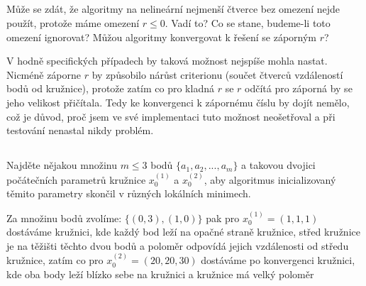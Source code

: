 \documentclass[10pt,a4paper,openright]{article}
\begin{document}
\subsection{}
Může se zdát, že algoritmy na nelineární nejmenší čtverce bez omezení nejde použít, 
protože máme omezení $r \le 0$. Vadí to? 
Co se stane, budeme-li toto omezení ignorovat? 
Můžou algoritmy konvergovat k řešení se záporným $r$?

V hodně specifických případech by taková možnost nejspíše mohla nastat. Nicméně 
záporne $r$ by způsobilo nárůst criterionu (součet čtverců vzdáleností bodů od kružnice),
protože zatím co pro kladná $r$ se $r$ odčítá pro záporná by se jeho velikost přičítala.
Tedy ke konvergenci k zápornému číslu by dojít nemělo, což je důvod, proč jsem
ve své implementaci tuto možnost neošetřoval a při testování nenastal nikdy problém.

\subsection{}
Najděte nějakou množinu $m \le 3$ bodů $\{a_1,a_2,...,a_m\}$
a takovou dvojici počátečních parametrů kružnice $x^{(1)}_0$ a $x^{(2)}_0$, 
aby algoritmus inicializovaný těmito parametry skončil v různých lokálních minimech.

Za množinu bodů zvolíme: $\{(0,3),(1,0)\}$ pak pro $x^{(1)}_0 = (1, 1, 1)$ dostáváme kružnici, kde každý
bod leží na opačné straně kružnice, střed kružnice je na těžišti těchto dvou bodů a
poloměr odpovídá jejich vzdálenosti od středu kružnice, zatím co pro $x^{(2)}_0 = (20, 20, 30)$
dostáváme po konvergenci kružnici, kde oba body leží blízko sebe na kružnici a kružnice má
velký poloměr
\end{document}
